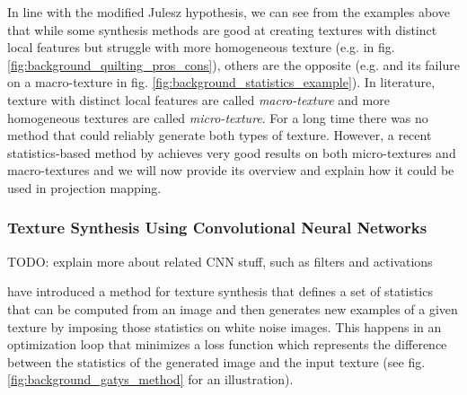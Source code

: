 In line with the modified Julesz hypothesis, we can see from the examples above that while some synthesis methods are good at creating textures with distinct local features but struggle with more homogeneous texture (e.g. \citet{Efros2001} in fig. \ref{fig:background_quilting_pros_cons}), others are the opposite (e.g. \citet{Galerne2011} and its failure on a macro-texture in fig. \ref{fig:background_statistics_example}). In literature, texture with distinct local features are called \textit{macro-texture} and more homogeneous textures are called \textit{micro-texture}. For a long time there was no method that could reliably generate both types of texture. However, a recent statistics-based method by \citet{Gatys2015} achieves very good results on both micro-textures and macro-textures and we will now provide its overview and explain how it could be used in projection mapping.

\subsubsection{Texture Synthesis Using Convolutional Neural Networks}
\label{section:background-texture_synthesis-statistics_based-synthesis_using_cnns}

{\color{red} TODO: explain more about related CNN stuff, such as filters and activations}

\citet{Gatys2015} have introduced a method for texture synthesis that defines a set of statistics that can be computed from an image and then generates new examples of a given texture by imposing those statistics on white noise images. This happens in an optimization loop that minimizes a loss function which represents the difference between the statistics of the generated image and the input texture (see fig. \ref{fig:background_gatys_method} for an illustration).

